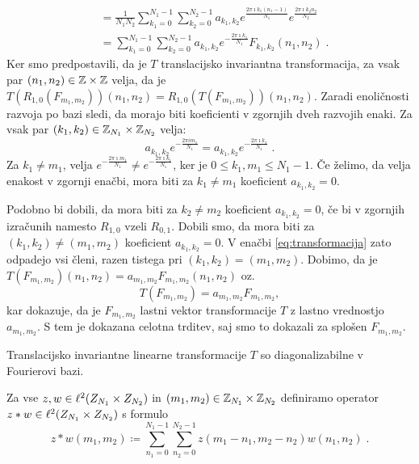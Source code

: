 \begin{dokaz}
\begin{align*}
& = \frac{1}{N_1N_2} \sum_{k_1=0}^{N_1-1} \sum_{k_2=0}^{N_2-1} a_{k_1, k_2} e^{\frac{2\pi \imath k_1(n_1-1)}{N_1}} e^{\frac{2\pi \imath k_2n_2}{N_2}} \\
& = \sum_{k_1=0}^{N_1-1} \sum_{k_2=0}^{N_2-1} a_{k_1, k_2} e^{-\frac{2\pi \imath k_1}{N_1}} F_{k_1, k_2}(n_1, n_2) \;.
\end{align*}
%
Ker smo predpostavili, da je $T$ translacijsko invariantna transformacija, za vsak par $(n_1, n_2) \in \mathbb Z \times \mathbb Z$ velja, da je $T(R_{1, 0} (F_{m_1, m_2}))(n_1, n_2) = R_{1, 0}(T(F_{m_1, m_2}))(n_1, n_2)$. Zaradi enoličnosti razvoja po bazi sledi, da morajo biti koeficienti v zgornjih dveh razvojih enaki. Za vsak par $(k_1, k_2) \in \mathbb Z_{N_1} \times \mathbb Z_{N_2}$ velja:
%
\begin{equation}
a_{k_1, k_2} e^{-\frac{2\pi im_1}{N_1}} = a_{k_1, k_2} e^{-\frac{2\pi \imath k_1}{N_1}} \;.
\end{equation} 
%
Za $k_1 \neq m_1$, velja $e^{-\frac{2\pi \imath m_1}{N_1}} \neq e^{-\frac{2\pi \imath k_1}{N_1}}$, ker je $0 \leq k_1, m_1 \leq N_1-1$. Če želimo, da velja enakost v zgornji enačbi, mora biti za $k_1 \neq m_1$ koeficient $a_{k_1, k_2} = 0$.

Podobno bi dobili, da mora biti za $k_2 \neq m_2$ koeficient $a_{k_1, k_2} = 0$, če bi v zgornjih izračunih namesto $R_{1, 0}$ vzeli $R_{0, 1}$. Dobili smo, da mora biti za $(k_1, k_2) \neq (m_1, m_2)$ koeficient $a_{k_1, k_2} = 0$. V enačbi \eqref{eq:transformacija} zato odpadejo vsi členi, razen tistega pri $(k_1, k_2) = (m_1, m_2)$. Dobimo, da je $T(F_{m_1, m_2})(n_1, n_2) = a_{m_1, m_2}F_{m_1, m_2}(n_1, n_2)$ oz.\ 
$$T(F_{m_1, m_2}) = a_{m_1, m_2}F_{m_1, m_2},$$
kar dokazuje, da je $F_{m_1, m_2}$ lastni vektor transformacije $T$ z lastno vrednostjo $a_{m_1, m_2}$. S tem je dokazana celotna trditev, saj smo to dokazali za splošen $F_{m_1, m_2}$.
\end{dokaz}
%
\begin{posledica}
Translacijsko invariantne linearne transformacije $T$ so dia\-go\-na\-li\-za\-bil\-ne v Fourierovi bazi.
\end{posledica}
%
\begin{definicija}
Za vse $z, w \in \ell^2(Z_{N_1} \times Z_{N_2})$ in $(m_1, m_2) \in \mathbb Z_{N_1} \times \mathbb Z_{N_2}$ definiramo operator $z \ast w \in \ell^2(Z_{N_1} \times Z_{N_2})$ s formulo
$$z \ast w(m_1, m_2) \coloneqq \sum_{n_1 = 0}^{N_1 - 1} \sum_{n_2 = 0}^{N_2 - 1} z(m_1 - n_1, m_2 - n_2)w(n_1, n_2) \;.$$
\end{definicija}
%
